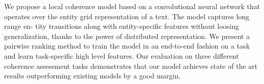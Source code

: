 We propose a local coherence model based on a convolutional neural network that operates over the entity grid representation of a text. The model captures long range en- tity transitions along with entity-specific features without loosing generalization, thanks to the power of distributed representation. We present a pairwise ranking method to train the model in an end-to-end fashion on a task and learn task-specific high level features. Our evaluation on three different coherence assessment tasks demonstrates that our model achieves state of the art results outperforming existing models by a good margin.
